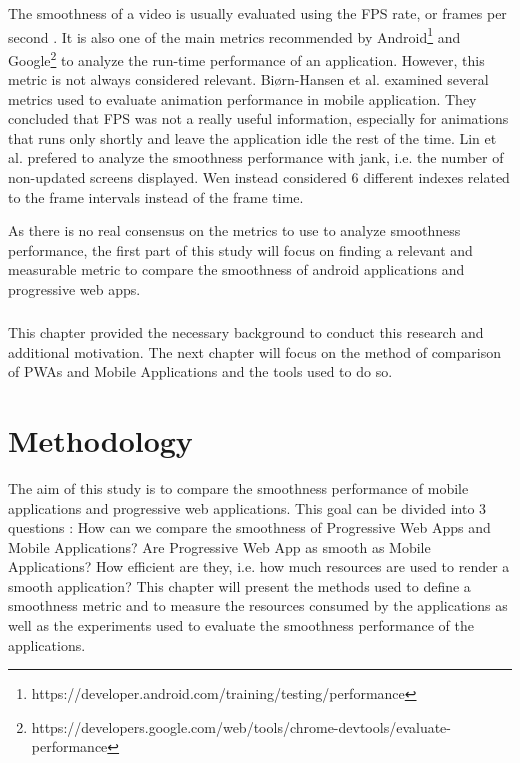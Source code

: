 \documentclass{kththesis}
\begin{document}
The smoothness of a video is usually evaluated using the FPS rate, or frames per second \cite{smooth_gui}. It is also one of the main metrics recommended by Android\footnote{https://developer.android.com/training/testing/performance} and Google\footnote{https://developers.google.com/web/tools/chrome-devtools/evaluate-performance} to analyze the run-time performance of an application.\newline
However, this metric is not always considered relevant. Biørn-Hansen et al. \cite{animation_performance} examined several metrics used to evaluate animation performance in mobile application. They concluded that FPS was not a really useful information, especially for animations that runs only shortly and leave the application idle the rest of the time. Lin et al. prefered to 
analyze the smoothness performance with jank, i.e. the number of non-updated screens displayed. Wen \cite{smoothnessQoE} instead considered 6 different indexes related to the frame intervals instead of the frame time. 

As there is no real consensus on the metrics to use to analyze smoothness performance,  the first part of this study will focus on finding a relevant and measurable metric to compare the smoothness of android applications and progressive web apps.




\paragraph{}
This chapter provided the necessary background to conduct this research and additional motivation. The next chapter will focus on the method of comparison of PWAs and Mobile Applications and the tools used to do so.
    

\chapter{Methodology}

The aim of this study is to compare the smoothness performance of mobile applications and progressive web applications. This goal can be divided into 3 questions : How can we compare the smoothness of Progressive Web Apps and Mobile Applications? Are Progressive Web App as smooth as Mobile Applications? How efficient are they, i.e. how much resources are used to render a smooth application? \newline
This chapter will present the methods used to define a smoothness metric and to measure the resources consumed by the applications as well as the experiments used to evaluate the smoothness performance of the applications.
\end{document}
